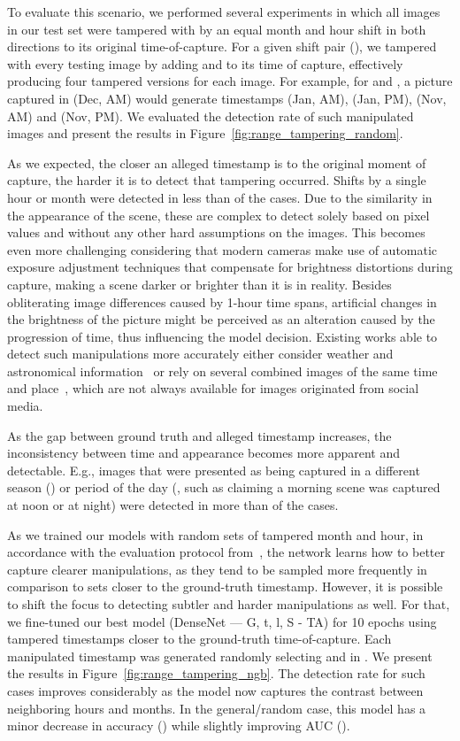 \documentclass[journal]{IEEEtran}
\begin{document}
        To evaluate this scenario, we performed several experiments in which all images in our test set were tampered with by an equal month and hour shift in both directions to its original time-of-capture. For a given shift pair (), we tampered with every testing image by adding  and  to its time of capture, effectively producing four tampered versions for each image. For example, for  and , a picture captured in (Dec, \textsc{AM}) would generate timestamps (Jan, \textsc{AM}), (Jan, \textsc{PM}), (Nov, \textsc{AM}) and (Nov, \textsc{PM}). We evaluated the detection rate of such manipulated images and present the results in Figure~\ref{fig:range_tampering_random}. 
    
        As we expected, the closer an alleged timestamp is to the original moment of capture, the harder it is to detect that tampering occurred. Shifts by a single hour or month were detected in less than  of the cases. Due to the similarity in the appearance of the scene, these are complex to detect solely based on pixel values and without any other hard assumptions on the images. This becomes even more challenging considering that modern cameras make use of automatic exposure adjustment techniques that compensate for brightness distortions during capture, making a scene darker or brighter than it is in reality.  Besides obliterating image differences caused by 1-hour time spans, artificial changes in the brightness of the picture might be perceived as an alteration caused by the progression of time, thus influencing the model decision. Existing works able to detect such manipulations more accurately either consider weather and astronomical information~\cite{ghosh2017detection} or rely on several combined images of the same time and place~\cite{chen2019deep}, which are not always available for images originated from social media.
        
        As the gap between ground truth and alleged timestamp increases, the inconsistency between time and appearance becomes more apparent and detectable. E.g., images that were presented as being captured in a different season () or period of the day (, such as claiming a morning scene was captured at noon or at night) were detected in more than  of the cases.
        
        As we trained our models with random sets of tampered month and hour, in accordance with the evaluation protocol from~\cite{salem2020learning}, the network learns how to better capture clearer manipulations, as they tend to be sampled more frequently in comparison to sets closer to the ground-truth timestamp. However, it is possible to shift the focus to detecting subtler and harder manipulations as well. For that, we fine-tuned our best model (DenseNet — G, t, l, S - TA) for 10 epochs using tampered timestamps closer to the ground-truth time-of-capture. Each manipulated timestamp was generated randomly selecting  and  in . We present the results in Figure~\ref{fig:range_tampering_ngb}. The detection rate for such cases improves considerably as the model now captures the contrast between neighboring hours and months. In the general/random case, this model has a minor decrease in accuracy () while slightly improving AUC ().
        
\end{document}
